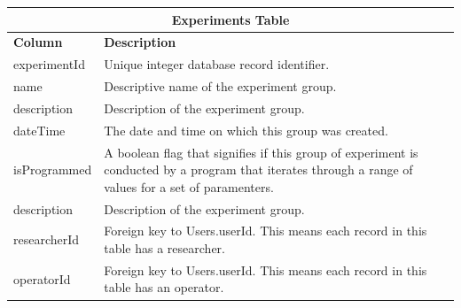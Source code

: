 \begin{table}[h!]
\centering
\begin{tabular}{l p{12cm}}
\multicolumn{2}{c}{\bf Experiments Table} \\ \hline
{\bf Column} & {\bf Description}\\ \hline
experimentId & Unique integer database record identifier.\\ \hline
name & Descriptive name of the experiment group.\\ \hline
description & Description of the experiment group.\\ \hline
dateTime & The date and time on which this group was created.\\ \hline
isProgrammed & A boolean flag that signifies if this group of experiment is conducted by a program that iterates through a range of values for a set of paramenters.\\ \hline
description & Description of the experiment group.\\ \hline
researcherId & Foreign key to Users.userId. This means each record in this table has a researcher.\\ \hline
operatorId & Foreign key to Users.userId. This means each record in this table has an operator.\\ \hline
\end{tabular}
\end{table}


